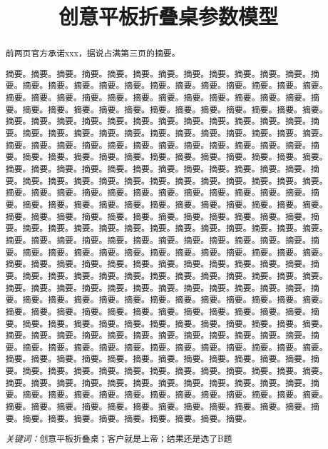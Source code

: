 \documentclass[12pt,a4paper]{article}
\title{创意平板折叠桌参数模型}
\author{}
\date{}
\begin{document}
\maketitle
\renewcommand{\abstractname}{摘要}
\begin{abstract}
前两页官方承诺xxx，据说占满第三页的摘要。\par
摘要。摘要。摘要。摘要。摘要。摘要。摘要。摘要。摘要。摘要。摘要。摘要。摘要。摘要。摘要。摘要。摘要。摘要。摘要。摘要。摘要。摘要。摘要。摘要。摘要。摘要。摘要。摘要。摘要。摘要。摘要。摘要。摘要。摘要。摘要。摘要。摘要。摘要。摘要。摘要。摘要。摘要。摘要。摘要。摘要。摘要。摘要。摘要。摘要。摘要。摘要。摘要。摘要。摘要。摘要。摘要。摘要。摘要。摘要。摘要。摘要。摘要。摘要。摘要。摘要。摘要。摘要。摘要。摘要。摘要。摘要。摘要。摘要。摘要。摘要。摘要。摘要。摘要。摘要。摘要。摘要。摘要。摘要。摘要。摘要。摘要。摘要。摘要。摘要。摘要。摘要。摘要。摘要。摘要。摘要。摘要。摘要。摘要。摘要。摘要。摘要。摘要。摘要。摘要。摘要。摘要。摘要。摘要。摘要。摘要。摘要。摘要。摘要。摘要。摘要。摘要。摘要。摘要。摘要。摘要。摘要。摘要。摘要。摘要。摘要。摘要。摘要。摘要。摘要。摘要。摘要。摘要。摘要。摘要。摘要。摘要。摘要。摘要。摘要。摘要。摘要。摘要。摘要。摘要。摘要。摘要。摘要。摘要。摘要。摘要。摘要。摘要。摘要。摘要。摘要。摘要。摘要。摘要。摘要。摘要。摘要。摘要。摘要。摘要。摘要。摘要。摘要。摘要。摘要。摘要。摘要。摘要。摘要。摘要。摘要。摘要。摘要。摘要。摘要。摘要。摘要。摘要。摘要。摘要。摘要。摘要。摘要。摘要。摘要。摘要。摘要。摘要。摘要。摘要。摘要。摘要。摘要。摘要。摘要。摘要。摘要。摘要。摘要。摘要。摘要。摘要。摘要。摘要。摘要。摘要。摘要。摘要。摘要。摘要。摘要。摘要。摘要。摘要。摘要。摘要。摘要。摘要。摘要。摘要。摘要。摘要。摘要。摘要。摘要。摘要。摘要。摘要。摘要。摘要。摘要。摘要。摘要。摘要。摘要。摘要。摘要。摘要。摘要。摘要。摘要。摘要。摘要。摘要。摘要。摘要。摘要。摘要。摘要。摘要。摘要。摘要。摘要。摘要。摘要。摘要。摘要。摘要。摘要。摘要。摘要。摘要。摘要。摘要。摘要。摘要。摘要。摘要。摘要。摘要。摘要。摘要。摘要。摘要。摘要。摘要。摘要。摘要。摘要。摘要。摘要。摘要。摘要。摘要。摘要。摘要。摘要。摘要。摘要。摘要。摘要。摘要。摘要。摘要。摘要。摘要。摘要。摘要。摘要。摘要。摘要。摘要。摘要。摘要。摘要。摘要。摘要。摘要。摘要。摘要。摘要。摘要。摘要。摘要。摘要。摘要。摘要。摘要。摘要。摘要。摘要。摘要。摘要。摘要。摘要。摘要。摘要。摘要。摘要。摘要。摘要。摘要。摘要。摘要。摘要。摘要。摘要。摘要。摘要。摘要。摘要。摘要。摘要。摘要。摘要。摘要。摘要。摘要。摘要。摘要。摘要。摘要。摘要。摘要。摘要。摘要。摘要。摘要。摘要。摘要。摘要。摘要。摘要。摘要。摘要。摘要。摘要。摘要。\par
\emph{关键词：}创意平板折叠桌；客户就是上帝；结果还是选了B题
\end{abstract}
\end{document}
